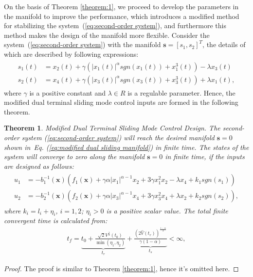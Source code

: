 \documentclass[3p]{elsarticle}
\theoremstyle{plain}
\newtheorem{mythm}{Theorem}
\theoremstyle{remark}
\begin{document}
On the basis of Theorem \ref{theorem:1}, we proceed to develop the parameters in the manifold to improve the performance, which introduces a modified method for stabilizing the system~(\ref{eq:second-order system}), and furthermore this method makes the design of the manifold more flexible. Consider the system~(\ref{eq:second-order system}) with the manifold $\bm s = [s_1,s_2]^T$, the details of which are described by following expressions:
\begin{align}
\begin{split}
s_1(t) &= x_2(t)+\gamma(\vert x_1(t)\vert^{\alpha} sgn(x_1(t))+x_1^3(t))-\lambda x_3(t)\\
s_2(t) &= x_4(t)+\gamma(\vert x_3(t)\vert^{\alpha} sgn(x_3(t))+x_3^3(t))+\lambda x_1(t),\label{eq:modified dual sliding manifold}
\end{split}
\end{align}
where $\gamma$ is a positive constant and $\lambda\in R$ is a regulable parameter. Hence, the modified dual terminal sliding mode control inputs are formed in the following theorem.
\begin{mythm}\label{theorem:2}Modified Dual Terminal Sliding Mode Control Design.
The second-order system (\ref{eq:second-order system}) will reach the desired manifold $\bm s = 0$ shown in~Eq. (\ref{eq:modified dual sliding manifold}) in finite time. The states of the system will converge to zero along the manifold $\bm s=0$ in finite time, if the inputs are designed as follows:
\begin{align}
\begin{split}
u_1 &= -b_1^{-1}(\bm x)(f_1(\bm x)+\gamma\alpha\vert x_1\vert^{\alpha-1}x_2+3\gamma x_1^2x_2-\lambda x_4+k_1sgn(s_1))\\
u_2 &= -b_2^{-1}(\bm x)(f_2(\bm x)+\gamma\alpha\vert x_3\vert^{\alpha-1}x_4+3\gamma x_3^2x_4+\lambda x_2+k_2sgn(s_2)),\label{eq:modified input}
\end{split}
\end{align}
where $k_i = l_i+\eta_i$, $i=1,2$; $\eta_i>0$ is a positive scalar value. The total finite convergent time is calculated from:
\begin{align}
t_f = \underbrace{t_0+\frac{\sqrt{2}V^{\frac{1}{2}}(t_0)}{\min(\eta_1,\eta_2)}}_{t_r}+\underbrace{\frac{(2\hat V(t_r))^{\frac{1-\alpha}{2}}}{\gamma(1-\alpha)}}_{t_s}<\infty,\label{eq:total convergent time}
\end{align}
\end{mythm}
\begin{proof}
The proof is similar to Theorem \ref{theorem:1}, hence it's omitted here.
\end{proof}
\end{document}
